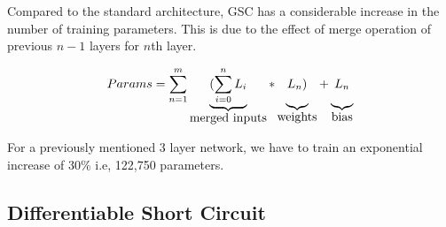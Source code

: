 \documentclass{article}
\begin{document}
Compared to the standard architecture, GSC has a considerable increase in the number of training parameters.  This is due to the effect of merge operation of previous $n-1$ layers for $n$th layer.

\begin{equation}
\label{eq:4}
Params= \sum_{n=1}^{m}
\underbrace{(\sum_{i=0}^{n}L_{i}\rule[-12pt]{0pt}{5pt}}_{\mbox{merged inputs}}
*\underbrace{L_{n})\rule[-12pt]{0pt}{5pt}}_{\mbox{weights}}
+\underbrace{L_{n}\rule[-12pt]{0pt}{5pt}}_{\mbox{bias}}
\end{equation}

For a previously mentioned 3 layer network, we have to train an exponential increase of 30\% i.e, 122,750 parameters.

\subsection{Differentiable Short Circuit}
\lipsum[6]
\lipsum[6]
\lipsum[6]
\lipsum[6]
\end{document}
